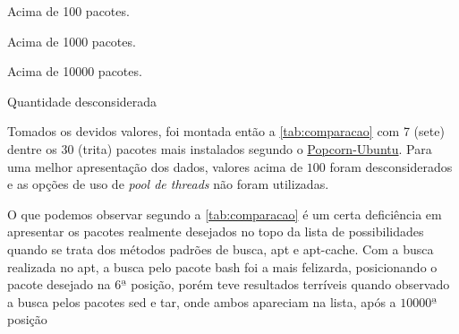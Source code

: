 \begin{table}[htbp]

\label{tab:comparacao}
\begin{description}
	\tiny
	\item [*] Acima de 100 pacotes.
	\item [**] Acima de 1000 pacotes.
	\item [***] Acima de 10000 pacotes.
	\item [$-$] Quantidade desconsiderada
\end{description}

\end{table}


Tomados os devidos valores, foi montada então a \autoref{tab:comparacao} com 7 (sete) dentre os 30 (trita) pacotes mais instalados segundo o \href{http://popcon.ubuntu.com/}{Popcorn-Ubuntu}. Para uma melhor apresentação dos dados, valores acima de $100$ foram desconsiderados e as opções de uso de \textit{pool de threads} não foram utilizadas.

O que  podemos observar  segundo a \autoref{tab:comparacao} é um certa deficiência em apresentar os pacotes realmente desejados no topo da lista de possibilidades quando se trata dos métodos padrões de busca, {\code apt} e {\code apt-cache}. Com a busca realizada no {\code apt}, a busca pelo pacote {\code bash} foi a mais felizarda, posicionando o pacote desejado na $6ª$ posição, porém teve resultados terríveis quando observado a busca pelos pacotes {\code sed} e {\code tar}, onde ambos apareciam na lista, após a $10000ª$ posição


